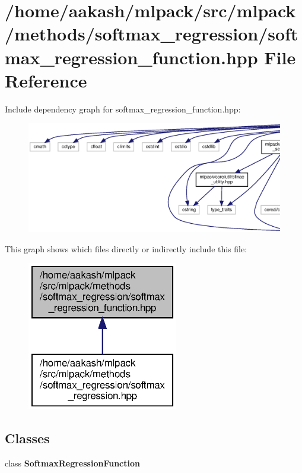 \section{/home/aakash/mlpack/src/mlpack/methods/softmax\+\_\+regression/softmax\+\_\+regression\+\_\+function.hpp File Reference}
\label{softmax__regression__function_8hpp}
Include dependency graph for softmax\+\_\+regression\+\_\+function.\+hpp\+:
\nopagebreak
\begin{figure}[H]
\begin{center}
\leavevmode
\includegraphics[width=350pt]{softmax__regression__function_8hpp__incl}
\end{center}
\end{figure}
This graph shows which files directly or indirectly include this file\+:
\nopagebreak
\begin{figure}[H]
\begin{center}
\leavevmode
\includegraphics[width=187pt]{softmax__regression__function_8hpp__dep__incl}
\end{center}
\end{figure}
\subsection*{Classes}
\begin{DoxyCompactItemize}
\item 
class \textbf{ Softmax\+Regression\+Function}
\end{DoxyCompactItemize}
